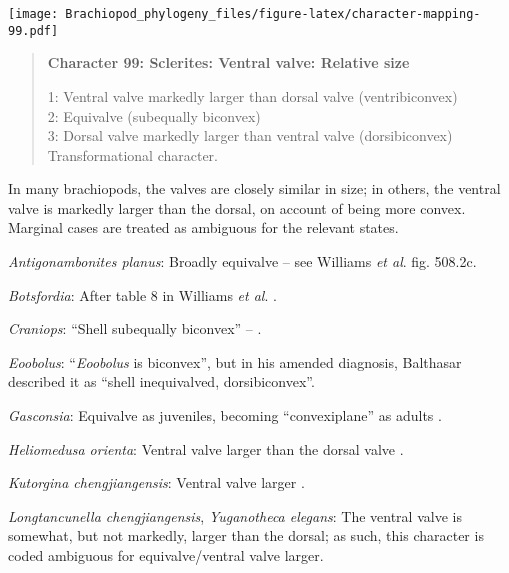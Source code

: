 \documentclass[openany]{book}
\theoremstyle{definition}
\theoremstyle{definition}
\theoremstyle{definition}
\theoremstyle{remark}
\begin{document}
\texttt{[image: Brachiopod\_phylogeny\_files/figure-latex/character-mapping-99.pdf]}

\begin{quote}
\textbf{Character 99: Sclerites: Ventral valve: Relative size}

1: Ventral valve markedly larger than dorsal valve (ventribiconvex)\\
2: Equivalve (subequally biconvex)\\
3: Dorsal valve markedly larger than ventral valve (dorsibiconvex)\\
Transformational character.
\end{quote}

In many brachiopods, the valves are closely similar in size; in others,
the ventral valve is markedly larger than the dorsal, on account of
being more convex. Marginal cases are treated as ambiguous for the
relevant states.

\hypertarget{Antigonambonites_planus-coding-99}{}
\emph{Antigonambonites planus}: Broadly equivalve -- see Williams
\emph{et al}. \citeyearpar{Williams2000LinguliformeaCraniiformea} fig.
508.2c.

\hypertarget{Botsfordia-coding-99}{}
\emph{Botsfordia}: After table 8 in Williams \emph{et al}.
\citeyearpar{Williams2000LinguliformeaCraniiformea}.

\hypertarget{Craniops-coding-99}{}
\emph{Craniops}: ``Shell subequally biconvex'' --
\citet{Williams2000LinguliformeaCraniiformea}.

\hypertarget{Eoobolus-coding-99}{}
\emph{Eoobolus}: ``\emph{Eoobolus} is biconvex'', but in his amended
diagnosis, Balthasar \citeyearpar{Balthasar2009Thebrachiopod} described
it as ``shell inequivalved, dorsibiconvex''.

\hypertarget{Gasconsia-coding-99}{}
\emph{Gasconsia}: Equivalve as juveniles, becoming ``convexiplane''
\citep[p.~187]{Williams2000LinguliformeaCraniiformea} as adults
\citep{Hanken1985Thetaxonomy}.

\hypertarget{Heliomedusa_orienta-coding-99}{}
\emph{Heliomedusa orienta}: Ventral valve larger than the dorsal valve
\citep[p.~659]{Zhang2009Architectureand}.

\hypertarget{Kutorgina_chengjiangensis-coding-99}{}
\emph{Kutorgina chengjiangensis}: Ventral valve larger \citep[see][fig.
125.]{Williams2000LinguliformeaCraniiformea}.

\hypertarget{Longtancunella_chengjiangensis-coding-99}{}
\emph{Longtancunella chengjiangensis}, \emph{Yuganotheca elegans}: The
ventral valve is somewhat, but not markedly, larger than the dorsal; as
such, this character is coded ambiguous for equivalve/ventral valve
larger.
\end{document}
